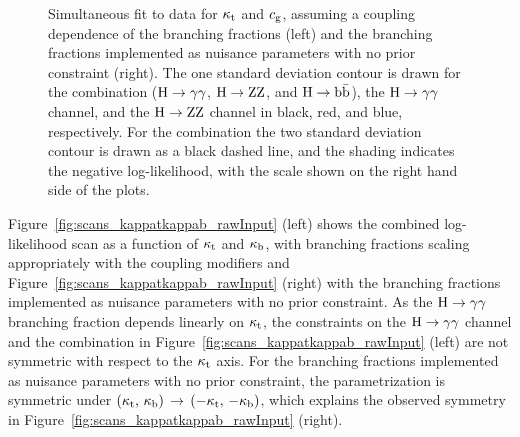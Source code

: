 \begin{figure}[hbtp]
\begin{center}
{        }
    \caption{
        Simultaneous fit to data for $\kappa_{\mathrm{t}}$ and $c_\mathrm{g}$, assuming a coupling dependence of the branching fractions (left) and the branching fractions implemented as nuisance parameters with no prior constraint (right).
        The one standard deviation contour is drawn for the combination ($\mathrm{H}\to\mathrm{\gamma}\mathrm{\gamma}$, $\mathrm{H}\to\mathrm{Z}\mathrm{Z}$, and $\mathrm{H}\to\mathrm{b}\bar{\mathrm{b}}$), the $\mathrm{H}\to\mathrm{\gamma}\mathrm{\gamma}$ channel, and the $\mathrm{H}\to\mathrm{Z}\mathrm{Z}$ channel in black, red, and blue, respectively.
        For the combination the two standard deviation contour is drawn as a black dashed line, and the shading indicates the negative log-likelihood, with the scale shown on the right hand side of the plots.
        }
    \label{fig:scans_kappatkappag_nominal}
  \end{center}
\end{figure}


Figure~\ref{fig:scans_kappatkappab_rawInput} (left) shows the combined log-likelihood scan as a function of $\kappa_{\mathrm{t}}$ and $\kappa_{\mathrm{b}}$, with branching fractions scaling appropriately with the coupling modifiers and Figure~\ref{fig:scans_kappatkappab_rawInput} (right) with the branching fractions implemented as nuisance parameters with no prior constraint.
% 
As the $\mathrm{H}\to\mathrm{\gamma}\mathrm{\gamma}$ branching fraction depends linearly on $\kappa_{\mathrm{t}}$, the constraints on the $\mathrm{H}\to\mathrm{\gamma}\mathrm{\gamma}$ channel and the combination in Figure~\ref{fig:scans_kappatkappab_rawInput} (left) are not symmetric with respect to the $\kappa_{\mathrm{t}}$ axis.
% 
For the branching fractions implemented as nuisance parameters with no prior constraint, the parametrization is symmetric under $(\kappa_{\mathrm{t}},\,\kappa_{\mathrm{b}}) \, \to \, (-\kappa_{\mathrm{t}},\,-\kappa_{\mathrm{b}})$, which explains the observed symmetry in Figure~\ref{fig:scans_kappatkappab_rawInput} (right).

